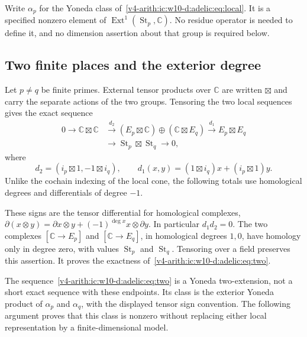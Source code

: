 Write $\alpha_p$ for the Yoneda class of~\eqref{v4-arith:ic:w10-d:adelic:eq:local}. It is a
specified nonzero element of $\operatorname{Ext}^1(\operatorname{St}_p,\mathbb C)$. No residue operator is
needed to define it, and no dimension assertion about that group is
required below.

\subsection{Two finite places and the exterior degree}

Let $p\ne q$ be finite primes. External tensor products over $\mathbb C$ are
written $\boxtimes$ and carry the separate actions of the two groups.
Tensoring the two local sequences gives the exact sequence
\begin{equation}\label{v4-arith:ic:w10-d:adelic:eq:two}
\begin{split}
 0\longrightarrow\mathbb C\boxtimes\mathbb C
 &\xrightarrow{d_2}
 (E_p\boxtimes\mathbb C)\oplus(\mathbb C\boxtimes E_q)
 \xrightarrow{d_1}E_p\boxtimes E_q\\
 &\longrightarrow\operatorname{St}_p\boxtimes\operatorname{St}_q\longrightarrow0,
\end{split}
\end{equation}
where
\[
 d_2=(i_p\boxtimes1,-1\boxtimes i_q),\qquad
 d_1(x,y)=(1\boxtimes i_q)x+(i_p\boxtimes1)y.
\]
Unlike the cochain indexing of the local cone, the following totals use homological degrees and differentials of degree $-1$.

These signs are the tensor differential for homological complexes,
$\partial(x\otimes y)=\partial x\otimes y+(-1)^{\deg x}x\otimes\partial y$.
In particular $d_1d_2=0$. The two complexes
$[\mathbb C\to E_p]$ and $[\mathbb C\to E_q]$, in homological degrees $1,0$,
have homology only in degree zero, with values $\operatorname{St}_p$ and $\operatorname{St}_q$.
Tensoring over a field preserves this assertion. It proves the exactness
of~\eqref{v4-arith:ic:w10-d:adelic:eq:two}.

The sequence~\eqref{v4-arith:ic:w10-d:adelic:eq:two} is a Yoneda two-extension, not a short exact
sequence with these endpoints. Its class is the exterior Yoneda product
of $\alpha_p$ and $\alpha_q$, with the displayed tensor sign convention.
The following argument proves that this class is nonzero without
replacing either local representation by a finite-dimensional model.

